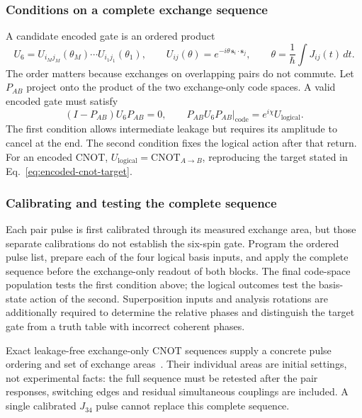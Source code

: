 \subsubsection{Conditions on a complete exchange sequence}

A candidate encoded gate is an ordered product
\begin{equation}
 U_6=U_{i_Mj_M}(\theta_M)\cdots U_{i_1j_1}(\theta_1),
 \qquad
 U_{ij}(\theta)=e^{-i\theta\,\mathbf s_i\cdot\mathbf s_j},
 \qquad
 \theta=\frac1\hbar\int J_{ij}(t)\,dt .
 \label{eq:calibration-six-spin-sequence}
\end{equation}
The order matters because exchanges on overlapping pairs do not
commute. Let $P_{AB}$ project onto the product of the two
exchange-only code spaces. A valid encoded gate must satisfy
\begin{equation}
 (I-P_{AB})U_6P_{AB}=0,
 \qquad
 \left.P_{AB}U_6P_{AB}\right|_{\mathrm{code}}
   =e^{i\chi}U_{\mathrm{logical}}.
 \label{eq:calibration-encoded-gate-conditions}
\end{equation}
The first condition allows intermediate leakage but requires its
amplitude to cancel at the end. The second condition fixes the
logical action after that return. For an encoded CNOT,
$U_{\mathrm{logical}}=\mathrm{CNOT}_{A\to B}$, reproducing the
target stated in Eq.~\eqref{eq:encoded-cnot-target}.

\subsubsection{Calibrating and testing the complete sequence}

Each pair pulse is first calibrated through its measured exchange
area, but those separate calibrations do not establish the
six-spin gate. Program the ordered pulse list, prepare each of the
four logical basis inputs, and apply the complete sequence before
the exchange-only readout of both blocks. The final code-space
population tests the first condition above; the logical outcomes
test the basis-state action of the second. Superposition inputs and
analysis rotations are additionally required to determine the
relative phases and distinguish the target gate from a truth table
with incorrect coherent phases.

Exact leakage-free exchange-only CNOT sequences supply a concrete
pulse ordering and set of exchange areas~\cite{FongWandzura2011}.
Their individual areas are initial settings, not experimental
facts: the full sequence must be retested after the pair responses,
switching edges and residual simultaneous couplings are included.
A single calibrated $J_{34}$ pulse cannot replace this complete
sequence.
